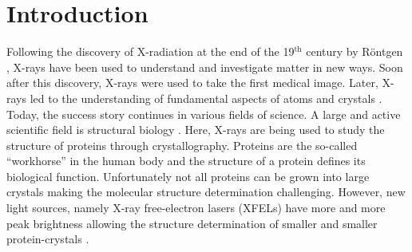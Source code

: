 \chapter{Introduction}
Following the discovery of X-radiation at the end of the 19$^{\text{th}}$ century by R\"ontgen \cite{Roentgen-NP}, X-rays have been used to understand and investigate matter in new ways. Soon after this discovery, X-rays were used to take the first medical image. Later, X-rays led to the understanding of fundamental aspects of atoms \citep{Siegbahn-NP} and crystals \citep{Laue-NP,Bragg-NP}. Today, the success story continues in various fields of science. A large and active scientific field is structural biology \cite{Karplus-NP,Kobilka-NP}. Here, X-rays are being used to study the structure of proteins through crystallography. Proteins are the so-called ``workhorse'' in the human body and the structure of a protein defines its biological function. Unfortunately not all proteins can be grown into large crystals making the molecular structure determination challenging. However, new light sources, namely X-ray free-electron lasers (XFELs) \citep{Ackermann-2007-NPho} have more and more peak brightness allowing the structure determination of smaller and smaller protein-crystals \citep{Chapman-2011-Nature}.\\[1\baselineskip]
